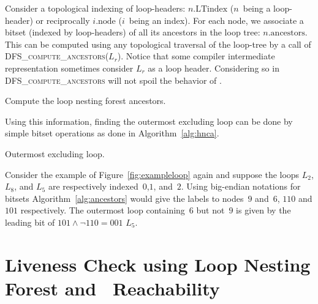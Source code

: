 Consider a topological indexing of loop-headers: $n.\textrm{LTindex}$ ($n$~being a loop-header) or reciprocally $i.\textrm{node}$ ($i$~being an index).
For each node, we associate a bitset (indexed by loop-headers) of all its ancestors in the loop tree:
$n.\textrm{ancestors}$.
This can be computed using any topological traversal of the loop-tree by a call of \textsc{DFS\_compute\_ancestors}($L_r$).
Notice that some compiler intermediate representation sometimes consider $L_r$ as a loop header.
Considering so in \textsc{DFS\_compute\_ancestors} will not spoil the behavior of \@OLE.

\begin{algorithm}
\caption{Compute the loop nesting forest ancestors.}
\label{alg:ancestors}
\end{algorithm}

Using this information, finding the outermost excluding loop can be done by simple bitset operations as done in Algorithm~\ref{alg:hnca}.

\begin{algorithm}
\caption{Outermost excluding loop.}
\label{alg:hnca}
\end{algorithm}

\begin{example}
	Consider the example of Figure~\ref{fig:exampleloop} again and suppose the loops $L_2$, $L_8$, and $L_5$ are respectively indexed~$0$,$1$, and~$2$.
	Using big-endian notations for bitsets Algorithm~\ref{alg:ancestors} would give the labels to nodes~$9$ and~$6$, $110$ and $101$ respectively.
	The outermost loop containing~$6$ but not~$9$ is given by the leading bit of $101\wedge \lnot 110=001$ \ie $L_5$.
\end{example}



\section{Liveness Check using Loop Nesting Forest and \Reduced\ Reachability}
\label{sec:live-check}


